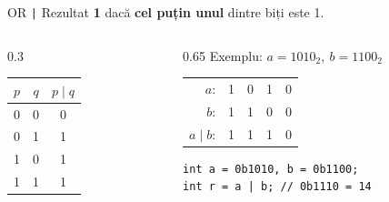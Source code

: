 ﻿\documentclass{beamer}
\begin{document}
\begin{frame}[fragile]{OR \textemdash{} \texttt{|}}
  Rezultat \textbf{1} dacă \textbf{cel puțin unul} dintre biți este 1.
  \bigskip
  \begin{columns}[T]
    \begin{column}{0.3\textwidth}
      \begin{center}
      \begin{tabular}{ccc}
        \toprule
        $p$ & $q$ & $p \mid q$ \\
        \midrule
        0 & 0 & 0 \\
        0 & 1 & 1 \\
        1 & 0 & 1 \\
        1 & 1 & 1 \\
        \bottomrule
      \end{tabular}
      \end{center}
    \end{column}
    \begin{column}{0.65\textwidth}
      Exemplu: $a = 1010_2,\ b = 1100_2$
      \begin{center}
      \begin{tabular}{rcccc}
        $a$:        & 1 & 0 & 1 & 0 \\
        $b$:        & 1 & 1 & 0 & 0 \\
        \hline
        $a \mid b$: & 1 & 1 & 1 & 0 \\
      \end{tabular}
      \end{center}
      \begin{center}
      \begin{lstlisting}
int a = 0b1010, b = 0b1100;
int r = a | b; // 0b1110 = 14
      \end{lstlisting}
      \end{center}
    \end{column}
  \end{columns}
\end{frame}
\end{document}
